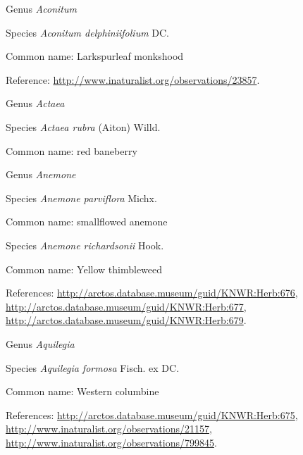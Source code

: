 \documentclass[9pt, article]{memoir}
\begin{document}
\begin{multicols}{2}
\vspace{6pt}\noindent\hspace{30pt}Genus \textit{Aconitum}


\vspace{6pt}\noindent\hspace{36pt}Species \textit{Aconitum delphiniifolium} DC.


Common name: Larkspurleaf monkshood

Reference: 
\url{http://www.inaturalist.org/observations/23857}.

\vspace{6pt}\noindent\hspace{30pt}Genus \textit{Actaea}


\vspace{6pt}\noindent\hspace{36pt}Species \textit{Actaea rubra} (Aiton) Willd.


Common name: red baneberry

\vspace{6pt}\noindent\hspace{30pt}Genus \textit{Anemone}


\vspace{6pt}\noindent\hspace{36pt}Species \textit{Anemone parviflora} Michx.


Common name: smallflowed anemone

\vspace{6pt}\noindent\hspace{36pt}Species \textit{Anemone richardsonii} Hook.


Common name: Yellow thimbleweed

References: 
\url{http://arctos.database.museum/guid/KNWR:Herb:676}, 
\url{http://arctos.database.museum/guid/KNWR:Herb:677}, 
\url{http://arctos.database.museum/guid/KNWR:Herb:679}.

\vspace{6pt}\noindent\hspace{30pt}Genus \textit{Aquilegia}


\vspace{6pt}\noindent\hspace{36pt}Species \textit{Aquilegia formosa} Fisch. ex DC.


Common name: Western columbine

References: 
\url{http://arctos.database.museum/guid/KNWR:Herb:675}, 
\url{http://www.inaturalist.org/observations/21157}, 
\url{http://www.inaturalist.org/observations/799845}.


\end{multicols}
\end{document}

